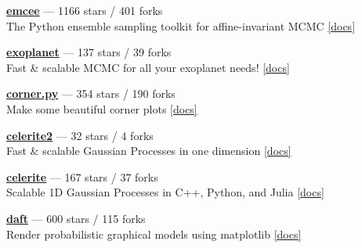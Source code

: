 \item \href{https://github.com/dfm/emcee}{{\bf emcee}} --- 1166 stars / 401 forks \\
The Python ensemble sampling toolkit for affine-invariant MCMC \href{https://emcee.readthedocs.io}{[docs]}

\item \href{https://github.com/exoplanet-dev/exoplanet}{{\bf exoplanet}} --- 137 stars / 39 forks \\
Fast {\&} scalable MCMC for all your exoplanet needs!  \href{https://docs.exoplanet.codes}{[docs]}

\item \href{https://github.com/dfm/corner.py}{{\bf corner.py}} --- 354 stars / 190 forks \\
Make some beautiful corner plots \href{http://corner.readthedocs.io}{[docs]}

\item \href{https://github.com/exoplanet-dev/celerite2}{{\bf celerite2}} --- 32 stars / 4 forks \\
Fast {\&} scalable Gaussian Processes in one dimension \href{https://celerite2.readthedocs.io}{[docs]}

\item \href{https://github.com/dfm/celerite}{{\bf celerite}} --- 167 stars / 37 forks \\
Scalable 1D Gaussian Processes in C++, Python, and Julia \href{http://celerite.rtfd.io}{[docs]}

\item \href{https://github.com/daft-dev/daft}{{\bf daft}} --- 600 stars / 115 forks \\
Render probabilistic graphical models using matplotlib \href{https://docs.daft-pgm.org}{[docs]}
